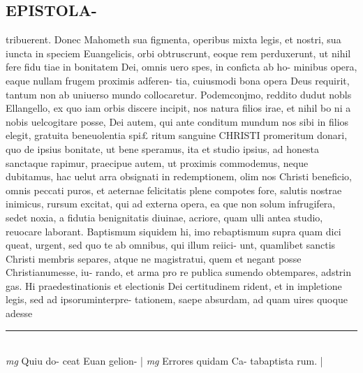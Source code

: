 \documentclass{article}
\begin{document}
\begin{pages}
\section*{EPISTOLA- }\pstart tribuerent. Donec Mahometh sua figmenta, operibus mixta legis, et nostri, sua iuncta in speciem Euangelicis, orbi obtruscrunt, eoque rem perduxerunt, ut nihil fere fidu tiae in bonitatem Dei, omnis uero spes, in conficta ab ho- minibus opera, eaque nullam frugem proximis adferen- tia, cuiusmodi bona opera Deus requirit, tantum non ab uniuerso mundo collocaretur.  \pend\pstart  Podemconjmo, reddito dudut nobls Ellangello, ex quo iam orbis discere incipit, nos natura filios irae, et nihil bo ni a nobis uelcogitare posse, Dei autem, qui ante conditum mundum nos sibi in filios elegit, gratuita beneuolentia spi£ ritum sanguine CHRISTI promeritum donari, quo de ipsius bonitate, ut bene speramus, ita et studio ipsius, ad honesta sanctaque rapimur, praecipue autem, ut proximis commodemus, neque dubitamus, hac uelut arra obsignati in redemptionem, olim nos Christi beneficio, omnis peccati puros, et aeternae felicitatis plene compotes fore, salutis nostrae inimicus, rursum excitat, qui ad externa opera, ea que non solum infrugifera, sedet noxia, a fidutia benignitatis diuinae, acriore, quam ulli antea studio, reuocare laborant. Baptismum siquidem hi, imo rebaptismum supra quam dici queat, urgent, sed quo te ab omnibus, qui illum reiici- unt, quamlibet sanctis Christi membris separes, atque ne magistratui, quem et negant posse Christianumesse, iu- rando, et arma pro re publica sumendo obtempares, adstrin gas. Hi praedestinationis et electionis Dei certitudinem rident, et in impletione legis, sed ad ipsoruminterpre- tationem, saepe absurdam, ad quam uires quoque adesse  \pend
\vspace{0.5cm}\noindent
\vspace{0.2cm}\rule{1cm}{0.2pt}\\ 
\hspace{0.2cm}\textit{mg}
\footnotesize Quiu do- ceat Euan gelion- 
\normalsize| 
\hspace{0.2cm}\textit{mg}
\footnotesize Errores quidam Ca- tabaptista rum. 
\normalsize| 

\end{pages}
\end{document}
